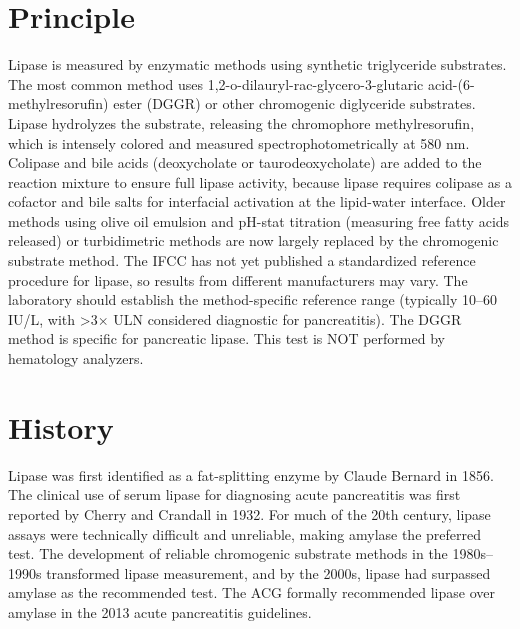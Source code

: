 \section*{Principle}
Lipase is measured by enzymatic methods using synthetic triglyceride substrates. The most common method uses 1,2-o-dilauryl-rac-glycero-3-glutaric acid-(6-methylresorufin) ester (DGGR) or other chromogenic diglyceride substrates. Lipase hydrolyzes the substrate, releasing the chromophore methylresorufin, which is intensely colored and measured spectrophotometrically at 580 nm. Colipase and bile acids (deoxycholate or taurodeoxycholate) are added to the reaction mixture to ensure full lipase activity, because lipase requires colipase as a cofactor and bile salts for interfacial activation at the lipid-water interface. Older methods using olive oil emulsion and pH-stat titration (measuring free fatty acids released) or turbidimetric methods are now largely replaced by the chromogenic substrate method. The IFCC has not yet published a standardized reference procedure for lipase, so results from different manufacturers may vary. The laboratory should establish the method-specific reference range (typically 10--60 IU/L, with >3$\times$ ULN considered diagnostic for pancreatitis). The DGGR method is specific for pancreatic lipase. This test is NOT performed by hematology analyzers.

\section*{History}
Lipase was first identified as a fat-splitting enzyme by Claude Bernard in 1856. The clinical use of serum lipase for diagnosing acute pancreatitis was first reported by Cherry and Crandall in 1932. For much of the 20th century, lipase assays were technically difficult and unreliable, making amylase the preferred test. The development of reliable chromogenic substrate methods in the 1980s--1990s transformed lipase measurement, and by the 2000s, lipase had surpassed amylase as the recommended test. The ACG formally recommended lipase over amylase in the 2013 acute pancreatitis guidelines.

